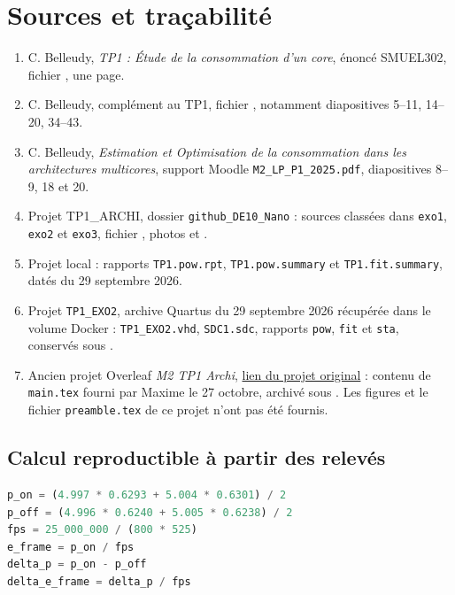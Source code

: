 \documentclass[11pt,a4paper]{article}
\begin{document}
\section*{Sources et traçabilité}
\begin{enumerate}
\item C. Belleudy, \emph{TP1 : Étude de la consommation d'un core}, énoncé SMUEL302, fichier , une page.
\item C. Belleudy, complément au TP1, fichier , notamment diapositives 5--11, 14--20, 34--43.
\item C. Belleudy, \emph{Estimation et Optimisation de la consommation dans les architectures multicores}, support Moodle \texttt{M2\_LP\_P1\_2025.pdf}, diapositives 8--9, 18 et 20.
\item Projet TP1\_ARCHI, dossier \texttt{github\_DE10\_Nano} : sources classées dans \texttt{exo1}, \texttt{exo2} et \texttt{exo3}, fichier , photos et .
\item Projet local  : rapports \texttt{TP1.pow.rpt}, \texttt{TP1.pow.summary} et \texttt{TP1.fit.summary}, datés du 29 septembre 2026.
\item Projet \texttt{TP1\_EXO2}, archive Quartus du 29 septembre 2026 récupérée dans le volume Docker : \texttt{TP1\_EXO2.vhd}, \texttt{SDC1.sdc}, rapports \texttt{pow}, \texttt{fit} et \texttt{sta}, conservés sous .
\item Ancien projet Overleaf \emph{M2 TP1 Archi}, \href{https://www.overleaf.com/project/6ab3907904aa18e619729093}{lien du projet original} : contenu de \texttt{main.tex} fourni par Maxime le 27 octobre, archivé sous . Les figures et le fichier \texttt{preamble.tex} de ce projet n'ont pas été fournis.
\end{enumerate}

\subsection*{Calcul reproductible à partir des relevés}
\begin{lstlisting}[language=Python]
p_on = (4.997 * 0.6293 + 5.004 * 0.6301) / 2
p_off = (4.996 * 0.6240 + 5.005 * 0.6238) / 2
fps = 25_000_000 / (800 * 525)
e_frame = p_on / fps
delta_p = p_on - p_off
delta_e_frame = delta_p / fps
\end{lstlisting}
\end{document}
